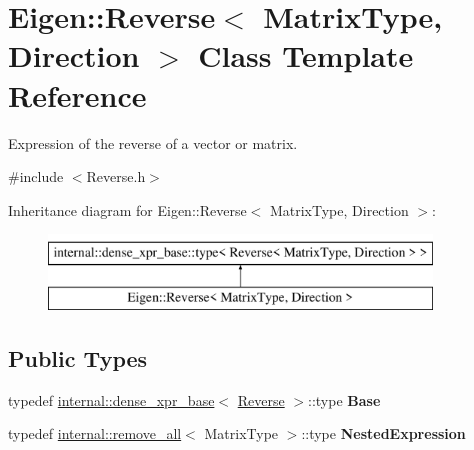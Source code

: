 \hypertarget{class_eigen_1_1_reverse}{}\section{Eigen\+::Reverse$<$ Matrix\+Type, Direction $>$ Class Template Reference}
\label{class_eigen_1_1_reverse}


Expression of the reverse of a vector or matrix.  




{\ttfamily \#include $<$Reverse.\+h$>$}

Inheritance diagram for Eigen\+::Reverse$<$ Matrix\+Type, Direction $>$\+:\begin{figure}[H]
\begin{center}
\leavevmode
\includegraphics[height=2.000000cm]{class_eigen_1_1_reverse}
\end{center}
\end{figure}
\subsection*{Public Types}
\begin{DoxyCompactItemize}
\item 
\mbox{\label{class_eigen_1_1_reverse_af8e484d71f37f971c051271bc137630a}} 
typedef \mbox{\hyperlink{struct_eigen_1_1internal_1_1dense__xpr__base}{internal\+::dense\+\_\+xpr\+\_\+base}}$<$ \mbox{\hyperlink{class_eigen_1_1_reverse}{Reverse}} $>$\+::type {\bfseries Base}
\item 
\mbox{\label{class_eigen_1_1_reverse_a2c2404c170c28f27eed92837ac2ec7f3}} 
typedef \mbox{\hyperlink{struct_eigen_1_1internal_1_1remove__all}{internal\+::remove\+\_\+all}}$<$ Matrix\+Type $>$\+::type {\bfseries Nested\+Expression}
\end{DoxyCompactItemize}
